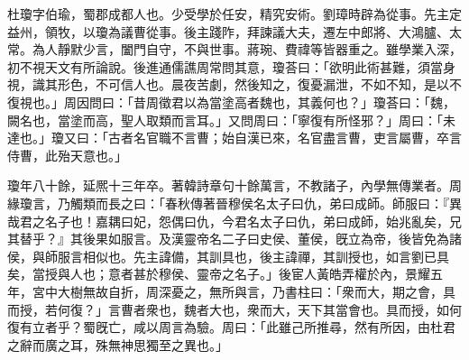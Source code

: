 \begin{pinyinscope}
 
 
 杜瓊字伯瑜，蜀郡成都人也。少受學於任安，精究安術。劉璋時辟為從事。先主定益州，領牧，以瓊為議曹從事。後主踐阼，拜諫議大夫，遷左中郎將、大鴻臚、太常。為人靜默少言，闔門自守，不與世事。蔣琬、費禕等皆器重之。雖學業入深，初不視天文有所論說。後進通儒譙周常問其意，瓊荅曰：「欲明此術甚難，須當身視，識其形色，不可信人也。晨夜苦劇，然後知之，復憂漏泄，不如不知，是以不復視也。」周因問曰：「昔周徵君以為當塗高者魏也，其義何也？」瓊荅曰：「魏，闕名也，當塗而高，聖人取類而言耳。」又問周曰：「寧復有所怪邪？」周曰：「未達也。」瓊又曰：「古者名官職不言曹；始自漢已來，名官盡言曹，吏言屬曹，卒言侍曹，此殆天意也。」
 
 
 
 
 瓊年八十餘，延熈十三年卒。著韓詩章句十餘萬言，不教諸子，內學無傳業者。周緣瓊言，乃觸類而長之曰：「春秋傳著晉穆侯名太子曰仇，弟曰成師。師服曰：『異哉君之名子也！嘉耦曰妃，怨偶曰仇，今君名太子曰仇，弟曰成師，始兆亂矣，兄其替乎？』其後果如服言。及漢靈帝名二子曰史侯、董侯，旣立為帝，後皆免為諸侯，與師服言相似也。先主諱備，其訓具也，後主諱禪，其訓授也，如言劉已具矣，當授與人也；意者甚於穆侯、靈帝之名子。」後宦人黃皓弄權於內，景耀五年，宮中大樹無故自折，周深憂之，無所與言，乃書柱曰：「衆而大，期之會，具而授，若何復？」言曹者衆也，魏者大也，衆而大，天下其當會也。具而授，如何復有立者乎？蜀旣亡，咸以周言為驗。周曰：「此雖己所推尋，然有所因，由杜君之辭而廣之耳，殊無神思獨至之異也。」
 
 
\end{pinyinscope}